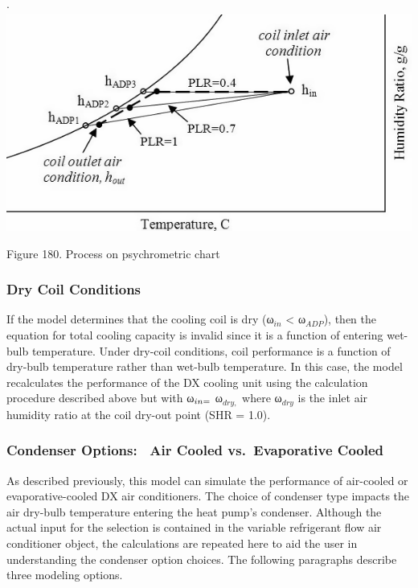 \(\cdot\) ~\includegraphics{media/image4182.png}

Figure 180. Process on psychrometric chart

\subsubsection{Dry Coil Conditions}\label{dry-coil-conditions-1}

If the model determines that the cooling coil is dry (ω\(_{in}\) \textless{} ω\(_{ADP}\)), then the equation for total cooling capacity is invalid since it is a function of entering wet-bulb temperature. Under dry-coil conditions, coil performance is a function of dry-bulb temperature rather than wet-bulb temperature. In this case, the model recalculates the performance of the DX cooling unit using the calculation procedure described above but with ω\(_{in\\ =}\) ω\(_{dry,}\) where ω\(_{dry}\) is the inlet air humidity ratio at the coil dry-out point (SHR = 1.0).

\subsubsection{Condenser Options:~ Air Cooled vs.~Evaporative Cooled}\label{condenser-options-air-cooled-vs.evaporative-cooled}

As described previously, this model can simulate the performance of air-cooled or evaporative-cooled DX air conditioners. The choice of condenser type impacts the air dry-bulb temperature entering the heat pump's condenser. Although the actual input for the selection is contained in the variable refrigerant flow air conditioner object, the calculations are repeated here to aid the user in understanding the condenser option choices. The following paragraphs describe three modeling options.


